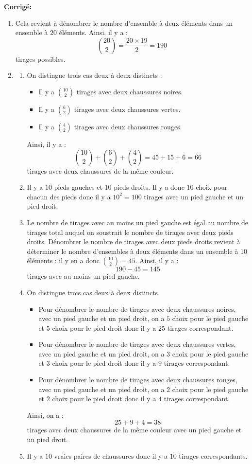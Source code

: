 \documentclass[a4paper,twoside,french,10pt]{VcCours}
\newcommand{\corr}{\textbf{Corrigé:}}
\begin{document}
\corr 
\begin{enumerate}
\item Cela revient à dénombrer le nombre d'ensemble à deux éléments dans un ensemble à $20$ éléments. Ainsi, il y a :
$$ \binom{20}{2} = \dfrac{20\times 19}{2} = 190$$
tirages possibles. 
\item \begin{enumerate}
\item On distingue trois cas deux à deux distincts :
\begin{itemize}
\item Il y a $\binom{10}{2}$ tirages avec deux chaussures noires.
\item Il y a $\binom{6}{2}$ tirages avec deux chaussures vertes.
\item Il y a $\binom{4}{2}$ tirages avec deux chaussures rouges.
\end{itemize}
Ainsi, il y a :
$$ \binom{10}{2} + \binom{6}{2} + \binom{4}{2} = 45+ 15+6=66$$
tirages avec deux chaussures de la même couleur.
\item Il y a $10$ pieds gauches et $10$ pieds droits. Il y a donc $10$ choix pour chacun des pieds donc il y a $10^2=100$ tirages avec un pied gauche et un pied droit.
\item Le nombre de tirages avec au moins un pied gauche est égal au nombre de tirages total auquel on soustrait le nombre de tirages avec deux pieds droits. Dénombrer le nombre de tirages avec deux pieds droits revient à déterminer le nombre d'ensembles à deux éléments dans un ensemble à $10$ éléments : il y en a donc $\binom{10}{2}=45$. Ainsi, il y a :
$$ 190 - 45= 145$$
tirages avec au moins un pied gauche. 
\item On distingue trois cas deux à deux distincts.
\begin{itemize}
\item Pour dénombrer le nombre de tirages avec deux chaussures noires, avec un pied gauche et un pied droit, on a $5$ choix pour le pied gauche et $5$ choix pour le pied droit donc il y a $25$ tirages correspondant.
\item Pour dénombrer le nombre de tirages avec deux chaussures vertes, avec un pied gauche et un pied droit, on a $3$ choix pour le pied gauche et $3$ choix pour le pied droit donc il y a $9$ tirages correspondant.
\item Pour dénombrer le nombre de tirages avec deux chaussures rouges, avec un pied gauche et un pied droit, on a $2$ choix pour le pied gauche et $2$ choix pour le pied droit donc il y a $4$ tirages correspondant.
\end{itemize}
Ainsi, on a :
$$ 25+9+4 = 38$$
tirages avec deux chaussures de la même couleur avec un pied gauche et un pied droit.
\item Il y a $10$ vraies paires de chaussures donc il y a $10$ tirages correspondants.
\end{enumerate}
\end{enumerate}
\end{document}
